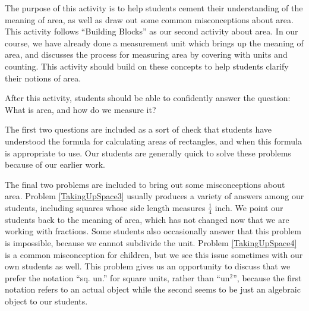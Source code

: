 \documentclass{ximera}
\begin{document}
\begin{instructorNotes}
The purpose of this activity is to help students cement their understanding of the meaning of area, as well as draw out some common misconceptions about area.  This activity follows ``Building Blocks'' as our second activity about area.  In our course, we have already done a measurement unit which brings up the meaning of area, and discusses the process for measuring area by covering with units and counting.  This activity should build on these concepts to help students clarify their notions of area.  

After this activity, students should be able to confidently answer the question: What is area, and how do we measure it?

The first two questions are included as a sort of check that students have understood the formula for calculating areas of rectangles, and when this formula is appropriate to use.  Our students are generally quick to solve these problems because of our earlier work.

The final two problems are included to bring out some misconceptions about area.  Problem \ref{TakingUpSpace3} usually produces a variety of answers among our students, including squares whose side length measures $\frac14$ inch.  We point our students back to the meaning of area, which has not changed now that we are working with fractions.  Some students also occasionally answer that this problem is impossible, because we cannot subdivide the unit.  Problem \ref{TakingUpSpace4} is a common misconception for children, but we see this issue sometimes with our own students as well.  This problem gives us an opportunity to discuss that we prefer the notation ``sq. un.'' for square units, rather than ``un$^2$'', because the first notation refers to an actual object while the second seems to be just an algebraic object to our students.


\end{instructorNotes}
\end{document}

